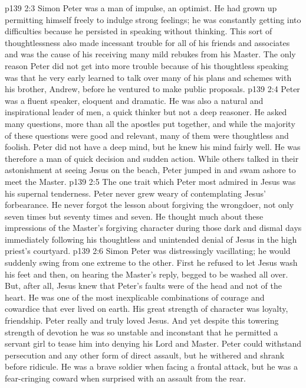 \pc \vs p139 2:3 Simon Peter was a man of impulse, an optimist. He had grown up permitting himself freely to indulge strong feelings; he was constantly getting into difficulties because he persisted in speaking without thinking. This sort of thoughtlessness also made incessant trouble for all of his friends and associates and was the cause of his receiving many mild rebukes from his Master. The only reason Peter did not get into more trouble because of his thoughtless speaking was that he very early learned to talk over many of his plans and schemes with his brother, Andrew, before he ventured to make public proposals.
\vs p139 2:4 Peter was a fluent speaker, eloquent and dramatic. He was also a natural and inspirational leader of men, a quick thinker but not a deep reasoner. He asked many questions, more than all the apostles put together, and while the majority of these questions were good and relevant, many of them were thoughtless and foolish. Peter did not have a deep mind, but he knew his mind fairly well. He was therefore a man of quick decision and sudden action. While others talked in their astonishment at seeing Jesus on the beach, Peter jumped in and swam ashore to meet the Master.
\pc \vs p139 2:5 The one trait which Peter most admired in Jesus was his supernal tenderness. Peter never grew weary of contemplating Jesus’ forbearance. He never forgot the lesson about forgiving the wrongdoer, not only seven times but seventy times and seven. He thought much about these impressions of the Master’s forgiving character during those dark and dismal days immediately following his thoughtless and unintended denial of Jesus in the high priest’s courtyard.
\pc \vs p139 2:6 Simon Peter was distressingly vacillating; he would suddenly swing from one extreme to the other. First he refused to let Jesus wash his feet and then, on hearing the Master’s reply, begged to be washed all over. But, after all, Jesus knew that Peter’s faults were of the head and not of the heart. He was one of the most inexplicable combinations of courage and cowardice that ever lived on earth. His great strength of character was loyalty, friendship. Peter really and truly loved Jesus. And yet despite this towering strength of devotion he was so unstable and inconstant that he permitted a servant girl to tease him into denying his Lord and Master. Peter could withstand persecution and any other form of direct assault, but he withered and shrank before ridicule. He was a brave soldier when facing a frontal attack, but he was a fear\hyp{}cringing coward when surprised with an assault from the rear.
